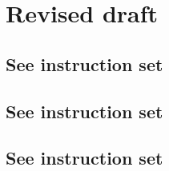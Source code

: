 %
%
%
\section{Revised draft}

	\subsection{See instruction set}

	\subsection{See instruction set}

	\subsection{See instruction set}